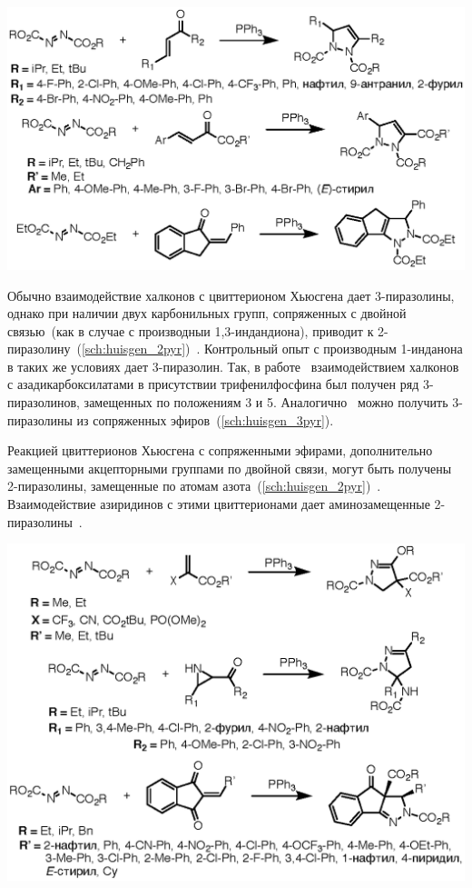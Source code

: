 \begin{scheme}[h!]
    \centering
    \includegraphics{sections/literature/img/huisgen_3pyr.eps}
    \caption{}
    \label{sch:huisgen_3pyr}
\end{scheme}

Обычно взаимодействие халконов с цвиттерионом Хьюсгена дает 3-пиразолины, однако при наличии двух карбонильных групп, сопряженных с двойной связью~(как в случае с производныи 1,3-индандиона), приводит к 2-пиразолину~(\ref{sch:huisgen_2pyr})~\cite{Li2017a}.
Контрольный опыт с производным 1-инданона в таких же условиях дает 3-пиразолин.
Так, в работе~\cite{Nair2007} взаимодействием халконов с азадикарбоксилатами в присутствии трифенилфосфина был получен ряд 3-пиразолинов, замещенных по положениям 3 и 5.
Аналогично~\cite{Zhang2018} можно получить 3-пиразолины из сопряженных эфиров~(\ref{sch:huisgen_3pyr}).

Реакцией цвиттерионов Хьюсгена с сопряженными эфирами, дополнительно замещенными акцепторными группами по двойной связи, могут быть получены 2-пиразолины, замещенные по атомам азота~(\ref{sch:huisgen_2pyr})~\cite{Yamazaki2012}.
Взаимодействие азиридинов с этими цвиттерионами дает аминозамещенные 2-пиразолины~\cite{Cui2008}.

\begin{scheme}[h!]
    \centering
    \includegraphics{sections/literature/img/huisgen_2pyr.eps}
    \caption{}
    \label{sch:huisgen_2pyr}
\end{scheme}

